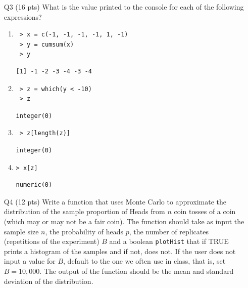 \documentclass[12pt]{article}
\theoremstyle{Conjecture}
\theoremstyle{example}
\theoremstyle{remark}
\theoremstyle{lemma}
\theoremstyle{definition}
\theoremstyle{corol}
\theoremstyle{proposition}
\theoremstyle{condition}
\begin{document}
\begin{enumerate}
\newpage
\item[Q3] (16 pts) What is the value printed to the console for each
  of the following expressions?
\begin{enumerate}
\item 
\begin{verbatim}
 > x = c(-1, -1, -1, -1, 1, -1) 
 > y = cumsum(x) 
 > y 
\end{verbatim}
\vspace{.5in}
\begin{verbatim}
[1] -1 -2 -3 -4 -3 -4
\end{verbatim}
\vspace{.5in}
\item 
\begin{verbatim}
 > z = which(y < -10) 
 > z
\end{verbatim}
\vspace{.5in}
\begin{verbatim}
integer(0)
\end{verbatim}
\vspace{.5in}
\item 
\begin{verbatim}
 > z[length(z)]
\end{verbatim}
\vspace{.5in}
\begin{verbatim}
integer(0)
\end{verbatim}
\vspace{.5in}
\item 
\begin{verbatim}
> x[z]
\end{verbatim}
\vspace{.5in}
\begin{verbatim}
numeric(0)
\end{verbatim}
\vspace{.5in}
\end{enumerate}

\newpage

\item[Q4] (12 pts) Write a function that uses Monte Carlo to
  approximate the distribution of the sample proportion of Heads from
  $n$ coin tosses of a coin (which may or may not be a fair coin). The
  function should take as input the sample size $n$, the probability
  of heads $p$, the number of replicates (repetitions of the experiment)
  $B$ and a boolean {\tt plotHist} that if TRUE prints a histogram of
  the samples and if not, does not. If the user does not input a value
  for $B$, default to the one we often use in class, that is, set
  $B=10,000$. The output of the function should be the mean and
  standard deviation of the distribution.


\end{enumerate}
\end{document}
